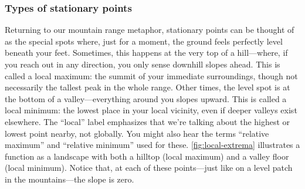 \subsubsection*{Types of stationary points}
Returning to our mountain range metaphor, stationary points can be thought of as the special spots where, just for a moment, the ground feels perfectly level beneath your feet. Sometimes, this happens at the very top of a hill—where, if you reach out in any direction, you only sense downhill slopes ahead. This is called a local maximum: the summit of your immediate surroundings, though not necessarily the tallest peak in the whole range. Other times, the level spot is at the bottom of a valley—everything around you slopes upward. This is called a local minimum: the lowest place in your local vicinity, even if deeper valleys exist elsewhere. The “local” label emphasizes that we’re talking about the highest or lowest point nearby, not globally. You might also hear the terms “relative maximum” and “relative minimum” used for these. \autoref{fig:local-extrema} illustrates a function as a landscape with both a hilltop (local maximum) and a valley floor (local minimum). Notice that, at each of these points—just like on a level patch in the mountains—the slope is zero.



